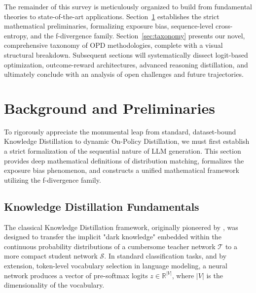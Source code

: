 The remainder of this survey is meticulously organized to build from fundamental theories to state-of-the-art applications. Section~\ref{sec:background} establishes the strict mathematical preliminaries, formalizing exposure bias, sequence-level cross-entropy, and the f-divergence family. Section~\ref{sec:taxonomy} presents our novel, comprehensive taxonomy of OPD methodologies, complete with a visual structural breakdown. Subsequent sections will systematically dissect logit-based optimization, outcome-reward architectures, advanced reasoning distillation, and ultimately conclude with an analysis of open challenges and future trajectories.


\section{Background and Preliminaries}
\label{sec:background}

To rigorously appreciate the monumental leap from standard, dataset-bound Knowledge Distillation to dynamic On-Policy Distillation, we must first establish a strict formalization of the sequential nature of LLM generation. This section provides deep mathematical definitions of distribution matching, formalizes the exposure bias phenomenon, and constructs a unified mathematical framework utilizing the f-divergence family.

\subsection{Knowledge Distillation Fundamentals}
\label{subsec:kd_fundamentals}

The classical Knowledge Distillation framework, originally pioneered by \citet{hinton2015distilling}, was designed to transfer the implicit "dark knowledge" embedded within the continuous probability distributions of a cumbersome teacher network $\mathcal{T}$ to a more compact student network $\mathcal{S}$. In standard classification tasks, and by extension, token-level vocabulary selection in language modeling, a neural network produces a vector of pre-softmax logits $z \in \mathbb{R}^{|V|}$, where $|V|$ is the dimensionality of the vocabulary. 

